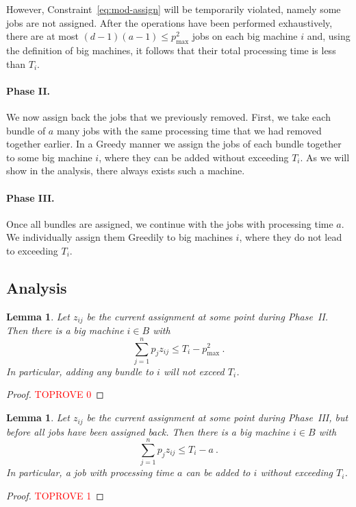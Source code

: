 \documentclass{article}
\newtheorem{lemma}[theorem]{Lemma}
\begin{document}
However, Constraint~\eqref{eq:mod-assign} will be temporarily violated, namely some jobs are not assigned.
After the operations have been performed exhaustively, there are at most $(d-1)(a - 1) \le p_{\max}^2$ jobs on each
big machine $i$ and, using the definition of big machines, it follows that their total processing time is less than $T_i$.

\paragraph{Phase II.} We now assign back the jobs that we previously removed.
First, we take each bundle of $a$ many jobs with the same processing time that we had removed together earlier.
In a Greedy manner we assign the jobs of each bundle together to some big machine $i$, where they can be 
added without exceeding $T_i$. As we will show in the analysis, there always exists such a machine.

\paragraph{Phase III.} Once all bundles are assigned, we continue with the jobs with processing time $a$. We individually assign
them Greedily to big machines $i$, where they do not lead to exceeding $T_i$.

\subsection{Analysis}
\begin{lemma}\label{lem:bundles}
	Let $z_{ij}$ be the current assignment at some point during Phase~II.
	Then there is a big machine $i\in B$ with
	\begin{equation*}
		\sum_{j=1}^n p_j z_{ij} \le T_i - p_{\max}^2 \ .
	\end{equation*}
	In particular, adding any bundle to $i$ will not exceed $T_i$.
\end{lemma}
\begin{proof}\textcolor{red}{TOPROVE 0}\end{proof}
\begin{lemma}
	Let $z_{ij}$ be the current assignment at some point during Phase~III, but before all jobs have been assigned back.
	Then there is a big machine $i\in B$ with
	\begin{equation*}
		\sum_{j=1}^n p_j z_{ij} \le T_i - a \ .
	\end{equation*}
	In particular, a job with processing time $a$ can be added to $i$ without exceeding $T_i$. 
\end{lemma}
\begin{proof}\textcolor{red}{TOPROVE 1}\end{proof}
\end{document}
